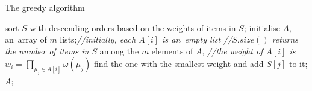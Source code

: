 \documentclass[runningheads,a4paper]{llncs}
\newcommand\CodeIndent{\hspace{1em}}
\begin{document}
\begin{algorithm}[!t]
\caption{The greedy algorithm}
\label{alg:greedy}
\begin{algorithmic}[1]
	\State sort $S$ with descending orders based on the weights of items in $S$;
    \State initialise $A$, an~array of $m$ lists;\hfill{\it //initially, each $A[i]$ is
     an~empty list}
     \hfill{\it //$S.size()$ returns the number of items in $S$ }
	\State among the $m$ elements of $A$, \hfill{\it //the weight of $A[i]$ is $w_i=\prod_{\mu_j \in
    A[i]} \omega(\mu_j)$ }
	\State \CodeIndent find the one with the smallest weight and add $S[j]$ to it;
	\EndFor
	\State \Return $A$;
\EndProcedure
\end{algorithmic}
\end{algorithm}
\end{document}
